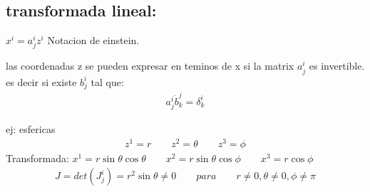 \documentclass{article}
\newcommand{\caja}[3]{%
  \begin{tcolorbox}[colback=#1!5!white,colframe=#1!25!black,title=#2]
    #3
  \end{tcolorbox}%
}
\begin{document}
\subsection{transformada lineal:}
$ x^i = a_j^i z^i $ Notacion de einstein.
\caja{green}{Teorema de la funcion inversa }{
  las coordenadas z se pueden expresar en teminos de x si la matrix $ a_j^i  $ es invertible. es decir si existe $ b_j^i  $ tal que: 
  \begin{gather}
     a_j^i \dot b_k^j = \delta_k^i
  \end{gather}
}
 ej: esfericas
 \begin{gather}
    z^1 = r \qquad z^2 = \theta \qquad z^3 = \phi
 \end{gather}
 Transformada: $ x^1 = r \sin{\theta }\cos{\theta} \qquad x^2 = r \sin{\theta}\cos{\phi} \qquad x^3=r \cos{\phi}$
 \begin{gather}
   J =  det(J_j^i) = r^2 \sin{\theta} \neq 0 \qquad para \qquad r \neq 0,\theta \neq 0, \phi \neq \pi    
 \end{gather}


\end{document}
